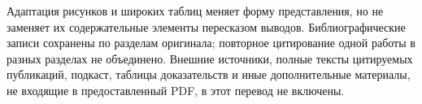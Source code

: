 \documentclass[11pt,a4paper]{article}
\begin{document}
Адаптация рисунков и широких таблиц меняет форму представления, но не заменяет их содержательные элементы пересказом выводов. Библиографические записи сохранены по разделам оригинала; повторное цитирование одной работы в разных разделах не объединено. Внешние источники, полные тексты цитируемых публикаций, подкаст, таблицы доказательств и иные дополнительные материалы, не входящие в предоставленный PDF, в этот перевод не включены.
\end{document}
